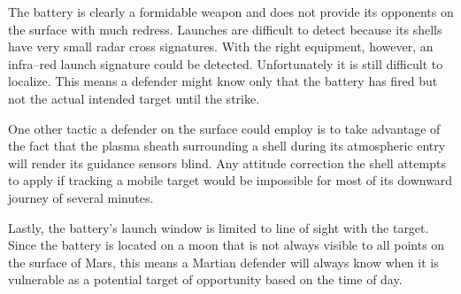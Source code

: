 The battery is clearly a formidable weapon and does not provide its opponents on the surface with much redress. Launches are difficult to detect because its shells have very small radar cross signatures. With the right equipment, however, an infra--red launch signature could be detected. Unfortunately it is still difficult to localize. This means a defender might know only that the battery has fired but not the actual intended target until the strike.

One other tactic a defender on the surface could employ is to take advantage of the fact that the plasma sheath surrounding a shell during its atmospheric entry will render its guidance sensors blind. Any attitude correction the shell attempts to apply if tracking a mobile target would be impossible for most of its downward journey of several minutes.

Lastly, the battery's launch window is limited to line of sight with the target. Since the battery is located on a moon that is not always visible to all points on the surface of Mars, this means a Martian defender will always know when it is vulnerable as a potential target of opportunity based on the time of day.


